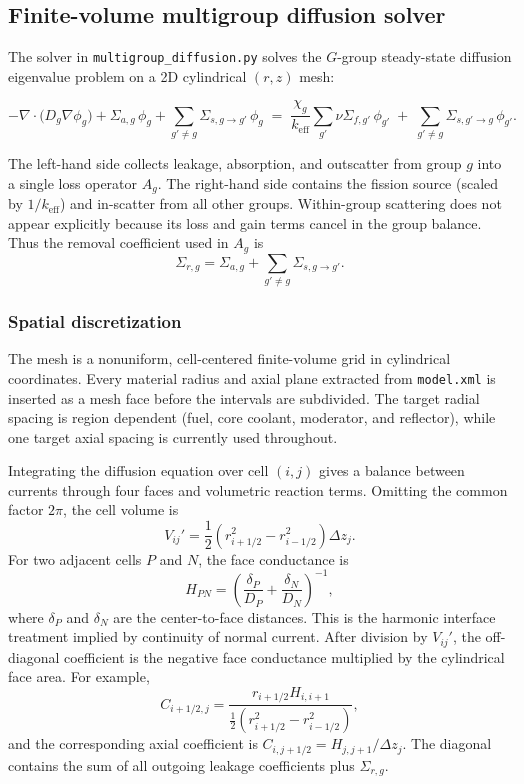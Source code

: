 \documentclass[11pt]{article}
\begin{document}
\subsection{Finite-volume multigroup diffusion solver}

The solver in \texttt{multigroup\_diffusion.py} solves the $G$-group
steady-state diffusion eigenvalue problem on a 2D cylindrical $(r,z)$ mesh:

\[
-\nabla \cdot \bigl(D_g \nabla \phi_g\bigr)
+ \Sigma_{a,g}\,\phi_g
+ \sum_{g'\neq g} \Sigma_{s,g\to g'}\,\phi_g
\;=\;
\frac{\chi_g}{k_{\mathrm{eff}}}
\sum_{g'} \nu\Sigma_{f,g'}\,\phi_{g'}
\;+\;
\sum_{g'\neq g} \Sigma_{s,g'\to g}\,\phi_{g'} .
\]

The left-hand side collects leakage, absorption, and outscatter from group
$g$ into a single loss operator $A_g$.  The right-hand side contains the
fission source (scaled by $1/k_{\mathrm{eff}}$) and in-scatter from all other
groups.  Within-group scattering does not appear explicitly because its loss
and gain terms cancel in the group balance.  Thus the removal coefficient used
in $A_g$ is
\[
\Sigma_{r,g} =
\Sigma_{a,g} + \sum_{g'\ne g}\Sigma_{s,g\to g'} .
\]

\subsubsection{Spatial discretization}

The mesh is a nonuniform, cell-centered finite-volume grid in cylindrical
coordinates.  Every material radius and axial plane extracted from
\texttt{model.xml} is inserted as a mesh face before the intervals are
subdivided.  The target radial spacing is region dependent (fuel, core
coolant, moderator, and reflector), while one target axial spacing is
currently used throughout.

Integrating the diffusion equation over cell $(i,j)$ gives a balance between
currents through four faces and volumetric reaction terms.  Omitting the
common factor $2\pi$, the cell volume is
\[
V_{ij}' =
\frac{1}{2}\left(r_{i+1/2}^{2}-r_{i-1/2}^{2}\right)\Delta z_j .
\]
For two adjacent cells $P$ and $N$, the face conductance is
\[
H_{PN}
=
\left(
\frac{\delta_P}{D_P}+\frac{\delta_N}{D_N}
\right)^{-1},
\]
where $\delta_P$ and $\delta_N$ are the center-to-face distances.  This is the
harmonic interface treatment implied by continuity of normal current.  After
division by $V_{ij}'$, the off-diagonal coefficient is the negative face
conductance multiplied by the cylindrical face area.  For example,
\[
C_{i+1/2,j}
=
\frac{r_{i+1/2}H_{i,i+1}}
{\tfrac12(r_{i+1/2}^{2}-r_{i-1/2}^{2})},
\]
and the corresponding axial coefficient is
$C_{i,j+1/2}=H_{j,j+1}/\Delta z_j$.  The diagonal contains the sum of all
outgoing leakage coefficients plus $\Sigma_{r,g}$.
\end{document}
